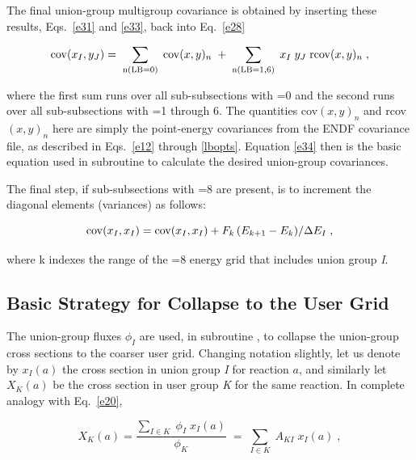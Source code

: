 \noindent
The final union-group multigroup covariance is obtained by inserting
these results, Eqs.~\ref{e31} and \ref{e33}, back into Eq.~\ref{e28}

\begin{equation} {\rm cov} (x_I,y_J) = \; \sum_{\rm n(LB=0)}  \;
{\rm cov} (x,y)_n \;+\; \sum_{\rm  n(LB=1,6)}  \;x_I\;y_J
\; {\rm r{\rm cov}} (x,y)_n\;,
\label{e34}
\end{equation}
\vspace{1 pt}

\noindent
where the first sum runs over all sub-subsections with =0 and
the second runs over all sub-subsections with =1 through 6.  The
quantities cov$(x,y)_n$ and r{\rm cov}$(x,y)_n$ here
are simply the point-energy covariances from the ENDF covariance file,
as described in Eqs.~\ref{e12} through \ref{lbopts}.  Equation \ref{e34}
then is the basic equation used in subroutine  to
calculate the desired union-group covariances.

The final step, if sub-subsections with =8 are present, is to
increment the diagonal elements (variances) as follows:

\begin{equation}
{\rm cov} (x_I, x_I) = {\rm cov} (x_I, x_I) +
F_k\,(E_{k+1} - E_k)/\Delta E_I \;,
\label{e35}
\end{equation}

\noindent
where k indexes the range of the =8 energy grid that includes
union group {\it I}.

\subsection{Basic Strategy for Collapse to the User Grid}
\label{ssERRORR_GridStrategy}

The union-group fluxes $\phi_I$ are used, in subroutine
, to collapse the union-group
cross sections to the coarser user grid.  Changing notation slightly,
let us denote by $x_I(a)$ the cross section in union group {\it I}
for reaction $a$, and similarly let $X_K (a)$ be the cross section
in user group {\it K} for the same reaction.  In complete analogy
with Eq.~\ref{e20},

\begin{equation}
X_K(a) = \frac {\displaystyle{\sum_{I\in K}\; \phi_I\;x_I(a)}}{\phi_K}
 \;=\; \sum_{I\in K} \; A_{KI} \; x_I(a)\;,
\end{equation}

